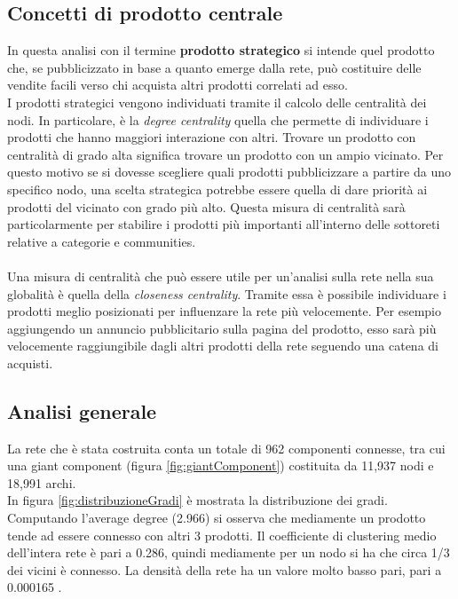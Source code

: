 \subsection{Concetti di prodotto centrale}
In questa analisi con il termine \textbf{prodotto strategico} si intende quel prodotto che, se pubblicizzato in base a quanto emerge dalla rete, può costituire delle vendite facili verso chi acquista altri prodotti correlati ad esso. \\
I prodotti strategici vengono individuati tramite il calcolo delle centralità dei nodi. In particolare, è la \textit{degree centrality} quella che permette di individuare i prodotti che hanno maggiori interazione con altri. Trovare un prodotto con centralità di grado alta significa trovare un prodotto con un ampio vicinato. Per questo motivo se si dovesse scegliere quali prodotti pubblicizzare a partire da uno specifico nodo, una scelta strategica potrebbe essere quella di dare priorità ai prodotti del vicinato con grado più alto. Questa misura di centralità sarà particolarmente per stabilire i prodotti più importanti all'interno delle sottoreti relative a categorie e communities. \\\\
Una misura di centralità che può essere utile per un'analisi sulla rete nella sua globalità è quella della \textit{closeness centrality}. Tramite essa è possibile individuare i prodotti meglio posizionati per influenzare la rete più velocemente. Per esempio aggiungendo un annuncio pubblicitario sulla pagina del prodotto, esso sarà più velocemente raggiungibile dagli altri prodotti della rete seguendo una catena di acquisti.
   

\subsection{Analisi generale}
La rete che è stata costruita conta un totale di 962 componenti connesse, tra cui una giant component (figura \ref{fig:giantComponent}) costituita da 11,937 nodi e 18,991 archi. \\
In figura \ref{fig:distribuzioneGradi} è mostrata la distribuzione dei gradi. Computando l'average degree (2.966) si osserva che mediamente un prodotto tende ad essere connesso con altri 3 prodotti. Il coefficiente di clustering medio dell'intera rete è pari a 0.286, quindi mediamente per un nodo si ha che circa 1/3 dei vicini è connesso. La densità della rete ha un valore molto basso pari, pari a 0.000165 . \\\\

